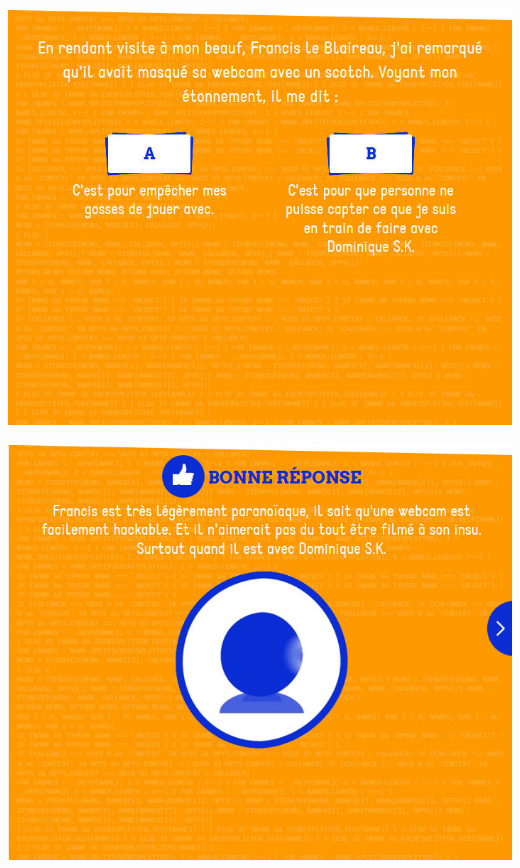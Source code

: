 \documentclass{beamer}
\begin{document}
\begin{frame}\includegraphics[scale=0.6] {./images/Quizz_HygieneNumerique_France4_28.jpg} \end{frame}
\begin{frame}\includegraphics[scale=0.6] {./images/Quizz_HygieneNumerique_France4_29.jpg} \end{frame}
\end{document}
